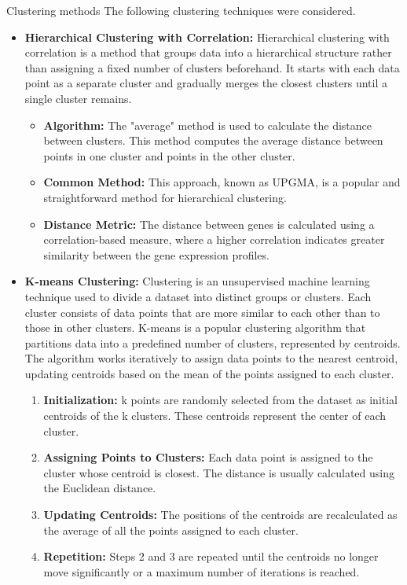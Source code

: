 \documentclass{llncs}
\begin{document}
Clustering methods The following clustering techniques were considered.


\begin{itemize}
	\item \textbf{Hierarchical Clustering with Correlation:} Hierarchical clustering with correlation is a method that groups data into a hierarchical structure rather than assigning a fixed number of clusters beforehand. It starts with each data point as a separate cluster and gradually merges the closest clusters until a single cluster remains.\cite{guess2002}
	
	\begin{itemize}
		\item \textbf{Algorithm:} The "average" method is used to calculate the distance between clusters. This method computes the average distance between points in one cluster and points in the other cluster.\cite{datta2003}
		
		\item \textbf{Common Method:} This approach, known as UPGMA, is a popular and straightforward method for hierarchical clustering.\cite{datta2003}
		
		\item \textbf{Distance Metric:} The distance between genes is calculated using a correlation-based measure, where a higher correlation indicates greater similarity between the gene expression profiles.\cite{datta2003}
	\end{itemize}
	
	
		
		\item \textbf{K-means Clustering:} Clustering is an unsupervised machine learning technique used to divide a dataset into distinct groups or clusters. Each cluster consists of data points that are more similar to each other than to those in other clusters. K-means is a popular clustering algorithm that partitions data into a predefined number of clusters, represented by centroids. The algorithm works iteratively to assign data points to the nearest centroid, updating centroids based on the mean of the points assigned to each cluster.\cite{steinley2006}
		
		\begin{enumerate}
			\item \textbf{Initialization:} k points are randomly selected from the dataset as initial centroids of the k clusters. These centroids represent the center of each cluster.
			\item \textbf{Assigning Points to Clusters:} Each data point is assigned to the cluster whose centroid is closest. The distance is usually calculated using the Euclidean distance.
			\item \textbf{Updating Centroids:} The positions of the centroids are recalculated as the average of all the points assigned to each cluster.
			\item \textbf{Repetition:} Steps 2 and 3 are repeated until the centroids no longer move significantly or a maximum number of iterations is reached.\cite{steinley2006}
		\end{enumerate}
		

\end{itemize}
\end{document}

